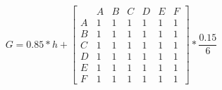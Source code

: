 \[G = 0.85*h + \left[ {\begin{array}{*{20}{c}}
{}&A&B&C&D&E&F\\
A&1&1&1&1&1&1\\
B&1&1&1&1&1&1\\
C&1&1&1&1&1&1\\
D&1&1&1&1&1&1\\
E&1&1&1&1&1&1\\
F&1&1&1&1&1&1
\end{array}} \right]*\frac{{0.15}}{6}\]

